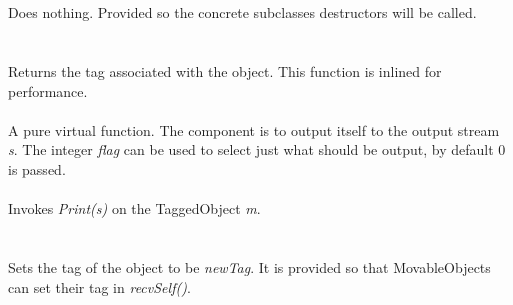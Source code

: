  \\
\\
Does nothing. Provided so the concrete subclasses destructors will be
called. \\

  \\
 \\
Returns the tag associated with the object. This function is inlined
for performance.\\

 \\
A pure virtual function. The component is to output itself to the output
stream {\em s}. The integer {\em flag} can be used to select just what
should be output, by default $0$ is passed. \\

 \\  
Invokes {\em Print(s)} on the TaggedObject {\em m}. \\

  \\
 \\
Sets the tag of the object to be {\em newTag}. It is provided so that
MovableObjects can set their tag in {\em recvSelf()}.







